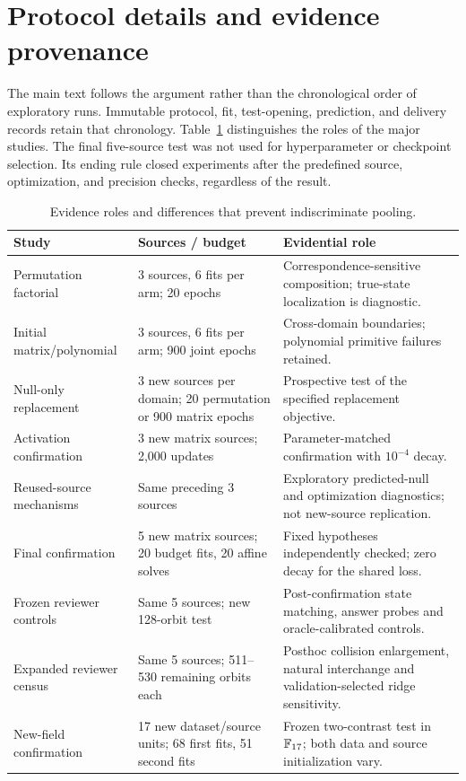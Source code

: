 \section{Protocol details and evidence provenance}
The main text follows the argument rather than the chronological order of exploratory runs.
Immutable protocol, fit, test-opening, prediction, and delivery records retain that chronology.
Table~\ref{tab:studies} distinguishes the roles of the major studies.
The final five-source test was not used for hyperparameter or checkpoint selection. Its ending rule closed experiments after the predefined source, optimization, and precision checks, regardless of the result.

\begin{table}[ht]\centering\small
\begin{tabular}{p{.23\linewidth}p{.24\linewidth}p{.42\linewidth}}
\toprule Study & Sources / budget & Evidential role\\\midrule
Permutation factorial & 3 sources, 6 fits per arm; 20 epochs & Correspondence-sensitive composition; true-state localization is diagnostic.\\
Initial matrix/polynomial & 3 sources, 6 fits per arm; 900 joint epochs & Cross-domain boundaries; polynomial primitive failures retained.\\
Null-only replacement & 3 new sources per domain; 20 permutation or 900 matrix epochs & Prospective test of the specified replacement objective.\\
Activation confirmation & 3 new matrix sources; 2,000 updates & Parameter-matched confirmation with $10^{-4}$ decay.\\
Reused-source mechanisms & Same preceding 3 sources & Exploratory predicted-null and optimization diagnostics; not new-source replication.\\
Final confirmation & 5 new matrix sources; 20 budget fits, 20 affine solves & Fixed hypotheses independently checked; zero decay for the shared loss.\\
Frozen reviewer controls & Same 5 sources; new 128-orbit test & Post-confirmation state matching, answer probes and oracle-calibrated controls.\\
Expanded reviewer census & Same 5 sources; 511--530 remaining orbits each & Posthoc collision enlargement, natural interchange and validation-selected ridge sensitivity.\\
New-field confirmation & 17 new dataset/source units; 68 first fits, 51 second fits & Frozen two-contrast test in $\mathbb{F}_{17}$; both data and source initialization vary.\\
\bottomrule
\end{tabular}
\caption{Evidence roles and differences that prevent indiscriminate pooling.}\label{tab:studies}
\end{table}

